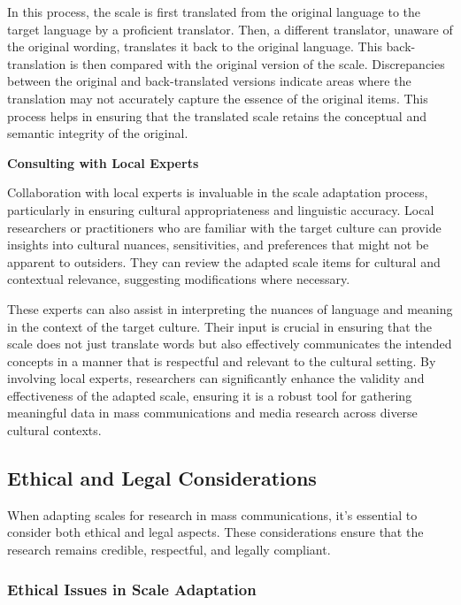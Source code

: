 \documentclass[
]{book}
\begin{document}
In this process, the scale is first translated from the original language to the target language by a proficient translator. Then, a different translator, unaware of the original wording, translates it back to the original language. This back-translation is then compared with the original version of the scale. Discrepancies between the original and back-translated versions indicate areas where the translation may not accurately capture the essence of the original items. This process helps in ensuring that the translated scale retains the conceptual and semantic integrity of the original.

\textbf{Consulting with Local Experts}

Collaboration with local experts is invaluable in the scale adaptation process, particularly in ensuring cultural appropriateness and linguistic accuracy. Local researchers or practitioners who are familiar with the target culture can provide insights into cultural nuances, sensitivities, and preferences that might not be apparent to outsiders. They can review the adapted scale items for cultural and contextual relevance, suggesting modifications where necessary.

These experts can also assist in interpreting the nuances of language and meaning in the context of the target culture. Their input is crucial in ensuring that the scale does not just translate words but also effectively communicates the intended concepts in a manner that is respectful and relevant to the cultural setting. By involving local experts, researchers can significantly enhance the validity and effectiveness of the adapted scale, ensuring it is a robust tool for gathering meaningful data in mass communications and media research across diverse cultural contexts.

\hypertarget{ethical-and-legal-considerations}{%
\subsection*{Ethical and Legal Considerations}\label{ethical-and-legal-considerations}}

When adapting scales for research in mass communications, it's essential to consider both ethical and legal aspects. These considerations ensure that the research remains credible, respectful, and legally compliant.

\hypertarget{ethical-issues-in-scale-adaptation}{%
\subsubsection*{Ethical Issues in Scale Adaptation}\label{ethical-issues-in-scale-adaptation}}
\end{document}
